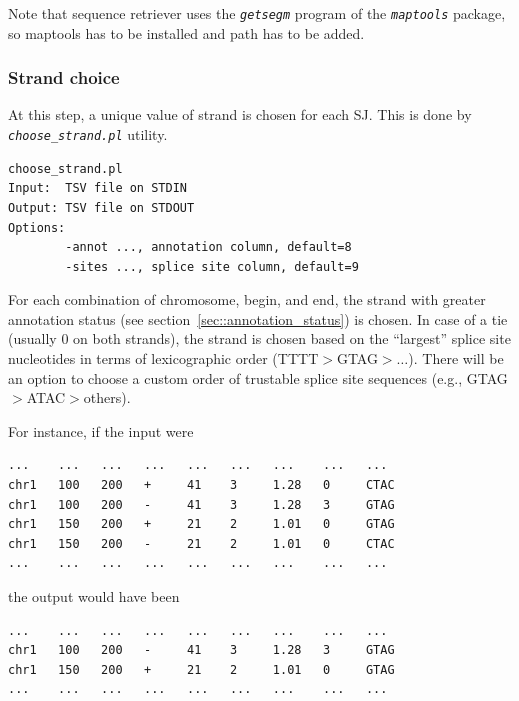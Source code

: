 \documentclass{article}
\newcommand{\prog}[1]{{\tt\em #1}}
\begin{document}
Note that sequence retriever uses the \prog{getsegm} program of the \prog{maptools} package, so maptools has to be installed and path has to be added.


\subsubsection{Strand choice}
At this step, a unique value of strand is chosen for each SJ. This is done by \prog{choose\_strand.pl} utility. 
\begin{verbatim}
choose_strand.pl
Input:  TSV file on STDIN
Output: TSV file on STDOUT
Options:
        -annot ..., annotation column, default=8
        -sites ..., splice site column, default=9
\end{verbatim}
For each combination of chromosome, begin, and end, the strand with greater annotation status (see section~\ref{sec::annotation_status}) is chosen. In case of 
a tie (usually $0$ on both strands), the strand is chosen based on the ``largest'' splice site nucleotides in terms of lexicographic order (TTTT$>$GTAG$>\dots$).
There will be an option to choose a custom order of trustable splice site sequences (e.g., GTAG$>$ATAC$>$others).

For instance, if the input were
\begin{verbatim}
...    ...   ...   ...   ...   ...   ...    ...   ...
chr1   100   200   +     41    3     1.28   0     CTAC
chr1   100   200   -     41    3     1.28   3     GTAG
chr1   150   200   +     21    2     1.01   0     GTAG
chr1   150   200   -     21    2     1.01   0     CTAC
...    ...   ...   ...   ...   ...   ...    ...   ...
\end{verbatim}
the output would have been 
\begin{verbatim}
...    ...   ...   ...   ...   ...   ...    ...   ...
chr1   100   200   -     41    3     1.28   3     GTAG
chr1   150   200   +     21    2     1.01   0     GTAG
...    ...   ...   ...   ...   ...   ...    ...   ...
\end{verbatim}

\end{document}
